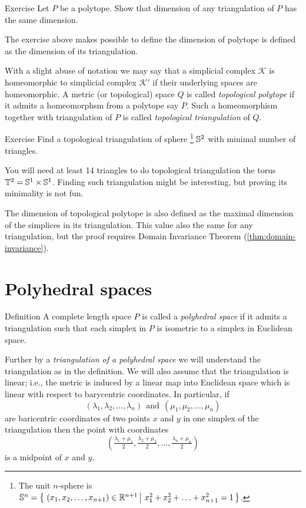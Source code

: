 \begin{thm}{Exercise}
Let $P$ be a polytope.
Show that dimension of any triangulation of $P$ has the same dimension.
\end{thm}

The exercise above makes possible to define
the dimension of polytope is defined 
as the dimension of its triangulation.

With a slight abuse of notation we may say that a simplicial complex $\mathcal{K}$ is homeomorphic to simplicial complex $\mathcal{K}'$
if their underlying spaces are homeomorphic.
A metric (or topological) space $Q$ is called \emph{topological polytope} if it admits a homeomorphsm from a polytope say $P$.
Such a homeomorphism together with triangulation of $P$
is called \emph{topological triangulation} of $Q$.  

\begin{thm}{Exercise}
Find a topological triangulation of sphere%
\footnote{The unit $n$-sphere is $\SS^n = \set{(x_1, x_2, \ldots, x_{n+1}) \in \mathbb{R}^{n+1}}{x_1^2 + x_2^2 + \ldots + x_{n+1}^2 = 1} $.} $\mathbb{S}^2$ with minimal number of triangles.
\end{thm}

You will need at least 14 triangles 
to do topological triangulation the torus $\mathbb{T}^2=\mathbb{S}^1\times\mathbb{S}^1$.
Finding such triangulation might be interesting, but proving its minimality is not fun.

The dimension of topological polytope is
 also defined as the maximal dimension of the 
simplices in its triangulation.
This value also the same for any triangulation,
but the proof requires Domain Invariance Theorem (\ref{thm:domain-invariance}).

\section{Polyhedral spaces}

\begin{thm}{Definition}\label{def:poly}
A complete length space $P$ is called a \emph{polyhedral space}
if it admits a triangulation such that each simplex in $P$ is isometric to a simplex in Euclidean space.
\end{thm}

Further by a \emph{triangulation of a polyhedral space} we will understand the triangulation as in the definition. 
We will also  assume that the triangulation is linear;
i.e., the metric is induced by a linear map into Euclidean space which is linear with respect to barycentric coordinates.
In particular, if 
$$(\lambda_1,\lambda_2,\dots,\lambda_n)\ \ \text{and}\ \ (\mu_1,\mu_2,\dots,\mu_n)$$
are baricentric coordinates of two points $x$ and $y$ in one simplex of the triangulation
then the point with coordinates 
$$(\tfrac{\lambda_1+\mu_1}2,\tfrac{\lambda_2+\mu_2}2,\dots,\tfrac{\lambda_n+\mu_n}2)$$
is a midpoint of $x$ and $y$.

